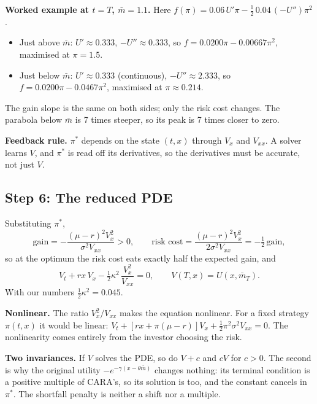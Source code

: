\documentclass[11pt]{article}
\newcommand{\mb}{\bar m}
\begin{document}
\textbf{Worked example at $t=T$, $\mb=1.1$.} Here
$f(\pi)=0.06\,U'\pi-\tfrac12\,0.04\,(-U'')\pi^2$.
\begin{itemize}
  \item Just above $\mb$: $U'\approx0.333$, $-U''\approx0.333$, so
        $f=0.0200\pi-0.00667\pi^2$, maximised at $\pi=1.5$.
  \item Just below $\mb$: $U'\approx0.333$ (continuous), $-U''\approx2.333$, so
        $f=0.0200\pi-0.0467\pi^2$, maximised at $\pi\approx0.214$.
\end{itemize}
The gain slope is the same on both sides; only the risk cost changes. The parabola below
$\mb$ is 7 times steeper, so its peak is 7 times closer to zero.

\textbf{Feedback rule.} $\pi^*$ depends on the state $(t,x)$ through $V_x$ and $V_{xx}$.
A solver learns $V$, and $\pi^*$ is read off its derivatives, so the derivatives must be
accurate, not just $V$.

\subsection*{Step 6: The reduced PDE}
Substituting $\pi^*$,
\[
  \text{gain} = -\frac{(\mu-r)^2V_x^2}{\sigma^2V_{xx}} > 0,\qquad
  \text{risk cost} = \frac{(\mu-r)^2V_x^2}{2\sigma^2V_{xx}} = -\tfrac12\,\text{gain},
\]
so at the optimum the risk cost eats exactly half the expected gain, and
\[
  \boxed{\;V_t + rx\,V_x - \tfrac12\kappa^2\,\frac{V_x^2}{V_{xx}} = 0,
  \qquad V(T,x)=U(x,\mb_T).\;}
\]
With our numbers $\tfrac12\kappa^2=0.045$.

\textbf{Nonlinear.} The ratio $V_x^2/V_{xx}$ makes the equation nonlinear. For a fixed
strategy $\pi(t,x)$ it would be linear:
$V_t + [rx+\pi(\mu-r)]V_x + \tfrac12\pi^2\sigma^2V_{xx}=0$. The nonlinearity comes entirely
from the investor choosing the risk.

\textbf{Two invariances.} If $V$ solves the PDE, so do $V+c$ and $cV$ for $c>0$. The second
is why the original utility $-e^{-\gamma(x-\theta\mb)}$ changes nothing: its terminal
condition is a positive multiple of CARA's, so its solution is too, and the constant cancels
in $\pi^*$. The shortfall penalty is neither a shift nor a multiple.
\end{document}
